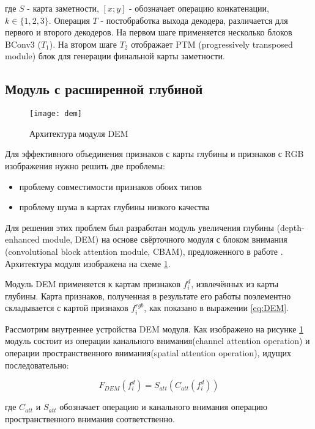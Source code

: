 где $S$ - карта заметности, $[x; y]$ - обозначает операцию конкатенации, $k \in \{1,2,3\}$. Операция $T$ - постобработка выхода декодера,
различается для первого и второго декодеров. На первом шаге применяется несколько блоков BConv3 ($T_1$). На втором шаге $T_2$ отображает
PTM (progressively transposed module) блок для генерации финальной карты заметности.


\subsection{Модуль с расширенной глубиной}

\begin{figure}[h]
    \centering
    \texttt{[image: dem]}
    \caption{Архитектура модуля DEM}
    \label{fig:dem}
\end{figure}

Для эффективного объединения признаков с карты глубины и признаков с RGB изображения нужно решить две проблемы:

\begin{itemize}
    \item проблему совместимости признаков обоих типов
    \item проблему шума в картах глубины низкого качества
\end{itemize}

Для решения этих проблем был разработан  модуль увеличения глубины (depth-enhanced module, DEM) на основе
свёрточного модуля с блоком внимания (convolutional block attention module, CBAM), предложенного в работе \cite{Cbam}.
Архитектура модуля изображена на схеме \ref{fig:dem}.

Модуль DEM применяется к картам признаков $f_i^d$, извлечённых из карты глубины. Карта признаков, полученная в результате его работы
поэлементно складывается с картой признаков $f_i^{rgb}$, как показано в выражении \eqref{eq:DEM}.

Рассмотрим внутреннее устройства DEM модуля. Как изображено на рисунке \ref{fig:dem} модуль состоит из
операции канального внимания(channel attention operation) и операции пространственного внимания(spatial attention operation), идущих последовательно:

\begin{equation}
    F_{DEM}(f_i^d)=S_{att}(C_{att}(f_i^d))
\end{equation}

где $C_{att}$ и $S_{att}$ обозначает операцию и канального внимания операцию пространственного внимания
соответственно.

